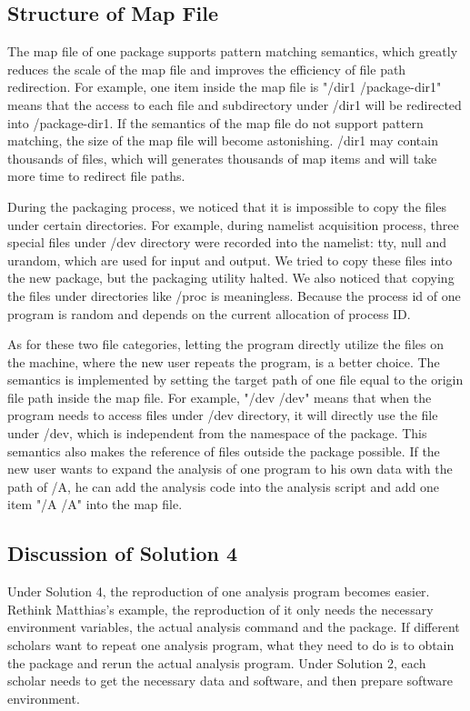 \documentclass{acm_proc_article-sp}
\begin{document}
\subsection{Structure of Map File} 

The map file of one package supports pattern matching semantics,
which greatly reduces the scale of the map file and improves the efficiency of file path redirection. 
For example,
one item inside the map file is "/dir1 /package-dir1" means that the access to each file and
subdirectory under /dir1 will be redirected into /package-dir1.
If the semantics of the map file do not support pattern matching, the size of the map file will become astonishing. 
/dir1 may contain thousands of files, which will generates thousands of map items and will take more time to redirect file paths.

During the packaging process, we noticed
that it is impossible to copy the files under certain directories.
For example, during namelist acquisition process, three special files under /dev directory were recorded into the namelist: tty, null and urandom, which are used for input and output.
We tried to copy these files into the new package, but the packaging utility halted.
We also noticed that copying the files under directories like /proc is
meaningless. Because the process id of one program is random and depends on the
current allocation of process ID. 

As for these two file categories, letting
the program directly utilize the files on the machine, where the new user
repeats the program, is a better choice. The semantics is implemented by
setting the target path of one file equal to the origin file path inside the
map file. For example, "/dev /dev" means that when the program needs to access
files under /dev directory, it will directly use the file under /dev, which is
independent from the namespace of the package. This semantics also makes the
reference of files outside the package possible. If the new user wants to
expand the analysis of one program to his own data with the path of /A, he can add the analysis
code into the analysis script and add one item "/A /A" into the map file.


\subsection{Discussion of Solution 4} 

Under Solution 4, the reproduction of one analysis program becomes easier.
Rethink Matthias's example, the reproduction of it only needs
the necessary environment variables, the actual analysis command
and the package. If different scholars want to repeat one analysis program,
what they need to do is to obtain the package and rerun the actual analysis
program. Under Solution 2, each scholar needs to get the necessary data and
software, and then prepare software environment. 
\end{document}
